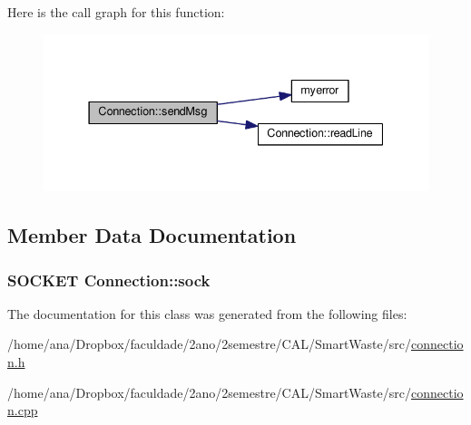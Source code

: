 Here is the call graph for this function\+:
\nopagebreak
\begin{figure}[H]
\begin{center}
\leavevmode
\includegraphics[width=337pt]{classConnection_a4b9f6db1fb42fc9857f829fa0bc52e6e_cgraph}
\end{center}
\end{figure}




\subsection{Member Data Documentation}
\subsubsection[{\texorpdfstring{sock}{sock}}]{\setlength{\rightskip}{0pt plus 5cm}S\+O\+C\+K\+ET Connection\+::sock\hspace{0.3cm}{\ttfamily [private]}}\hypertarget{classConnection_a50ca7c17a64836ca25a1fe9953cc6cf6}{}\label{classConnection_a50ca7c17a64836ca25a1fe9953cc6cf6}


The documentation for this class was generated from the following files\+:\begin{DoxyCompactItemize}
\item 
/home/ana/\+Dropbox/faculdade/2ano/2semestre/\+C\+A\+L/\+Smart\+Waste/src/\hyperlink{connection_8h}{connection.\+h}\item 
/home/ana/\+Dropbox/faculdade/2ano/2semestre/\+C\+A\+L/\+Smart\+Waste/src/\hyperlink{connection_8cpp}{connection.\+cpp}\end{DoxyCompactItemize}
